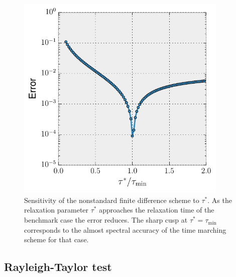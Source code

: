 \documentclass[preprint,12pt,authoryear]{elsarticle}
\begin{document}
\begin{figure}
\includegraphics[width=0.9\textwidth]{figures/tau_sensitivity.pdf}
\caption{Sensitivity of the nonstandard finite difference scheme to $\tau^*$. As the relaxation parameter $\tau^*$ approaches the relaxation time of the benchmark case the error reduces. The sharp cusp at $\tau^* = \tau_\mathrm{min}$ corresponds to the almost spectral accuracy of the time marching scheme for that case.}
\label{fig:tau_sensitivity}
\end{figure}

\subsection{Rayleigh-Taylor test}
\label{sec:rayleigh_taylor}
\end{document}

